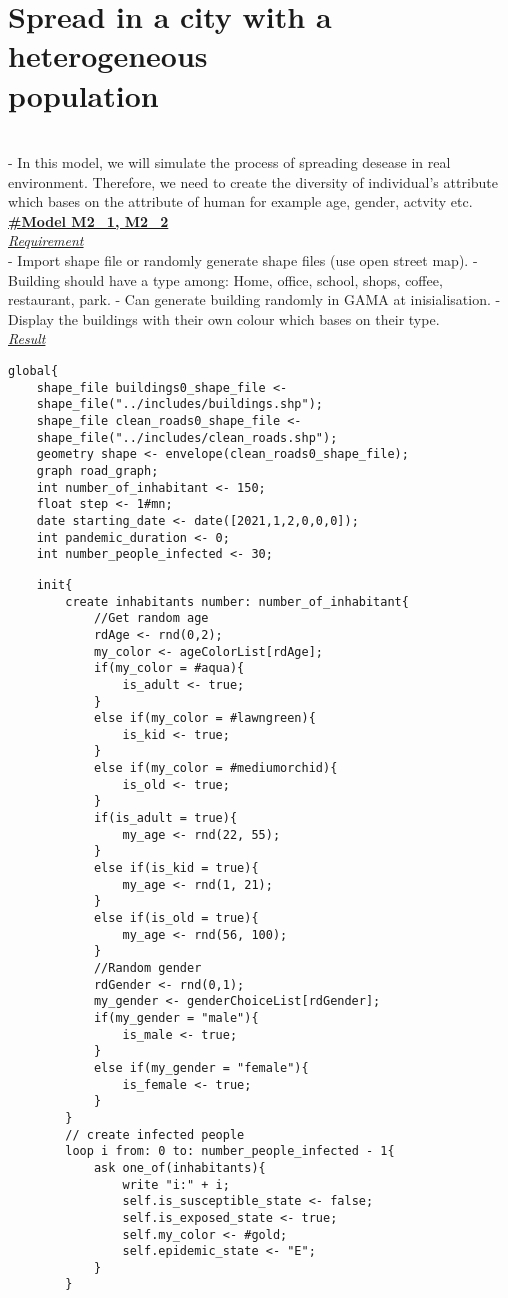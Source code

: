 \documentclass{article}
\begin{document}
\section{Spread in a city with a heterogeneous \\population}
\\- In this model, we will simulate the process of spreading desease in real environment. Therefore, we need to create the diversity of individual's attribute which bases on the attribute of human for example age, gender, actvity etc.
\\[1\baselineskip]
\underline{\textbf{#Model M2\_1, M2\_2}}
\\[1\baselineskip]
\underline{\emph{Requirement}}
\\[1\baselineskip]
- Import shape file or randomly generate shape files (use open street map).
- Building should have a type among: Home, office, school, shops, coffee, restaurant, park.
- Can generate building randomly in GAMA at inisialisation.
- Display the buildings with their own colour which bases on their type.
\\[1\baselineskip]
\underline{\emph{Result}}
\\[1\baselineskip]
\begin{tcolorbox}
\begin{lstlisting}
global{
	shape_file buildings0_shape_file <- 
	shape_file("../includes/buildings.shp");
	shape_file clean_roads0_shape_file <- 
	shape_file("../includes/clean_roads.shp");
	geometry shape <- envelope(clean_roads0_shape_file);
	graph road_graph;
	int number_of_inhabitant <- 150;
	float step <- 1#mn;
	date starting_date <- date([2021,1,2,0,0,0]);
	int pandemic_duration <- 0;
	int number_people_infected <- 30;
\end{lstlisting}
\end{tcolorbox}
\begin{tcolorbox}
\begin{lstlisting}
	init{
		create inhabitants number: number_of_inhabitant{
			//Get random age
			rdAge <- rnd(0,2);
			my_color <- ageColorList[rdAge];
			if(my_color = #aqua){
				is_adult <- true;
			}
			else if(my_color = #lawngreen){
				is_kid <- true;
			}
			else if(my_color = #mediumorchid){
				is_old <- true;
			}
			if(is_adult = true){
				my_age <- rnd(22, 55);
			}
			else if(is_kid = true){
				my_age <- rnd(1, 21);
			}
			else if(is_old = true){
				my_age <- rnd(56, 100);
			}
			//Random gender
			rdGender <- rnd(0,1);
			my_gender <- genderChoiceList[rdGender];
			if(my_gender = "male"){
				is_male <- true;
			}
			else if(my_gender = "female"){
				is_female <- true;
			}
		}
		// create infected people
		loop i from: 0 to: number_people_infected - 1{
			ask one_of(inhabitants){
				write "i:" + i;
				self.is_susceptible_state <- false;
				self.is_exposed_state <- true;
				self.my_color <- #gold;
				self.epidemic_state <- "E";
			}
		}
\end{lstlisting}
\end{tcolorbox}
\end{document}
